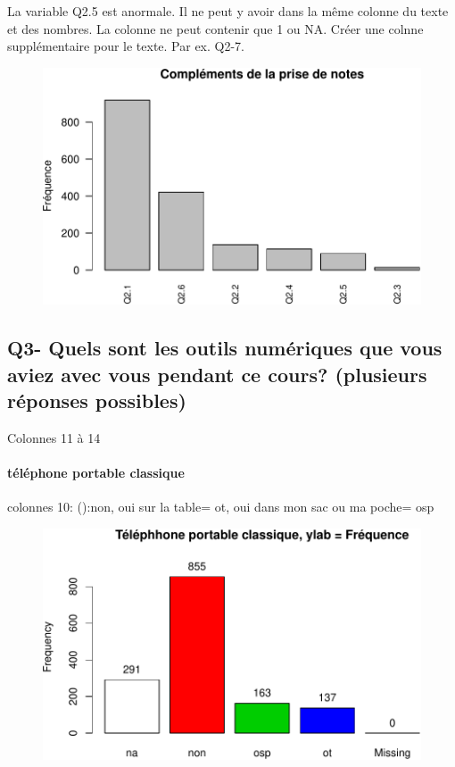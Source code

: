 \documentclass[]{article}
\begin{document}
La variable Q2.5 est anormale. Il ne peut y avoir dans la même colonne
du texte et des nombres. La colonne ne peut contenir que 1 ou NA. Créer
une colnne supplémentaire pour le texte. Par ex. Q2-7.

\begin{figure}[htbp]
\centering
\includegraphics{qs_etudiants_files/figure-latex/unnamed-chunk-3-1.pdf}
\end{figure}

\subsection{Q3- Quels sont les outils numériques que vous aviez avec
vous pendant ce cours? (plusieurs réponses
possibles)}\label{q3--quels-sont-les-outils-numeriques-que-vous-aviez-avec-vous-pendant-ce-cours-plusieurs-reponses-possibles}

Colonnes 11 à 14

\paragraph{téléphone portable
classique}\label{telephone-portable-classique}

colonnes 10: ():non, oui sur la table= ot, oui dans mon sac ou ma poche=
osp

\begin{figure}[htbp]
\centering
\includegraphics{qs_etudiants_files/figure-latex/outils-1.pdf}
\end{figure}
\end{document}
